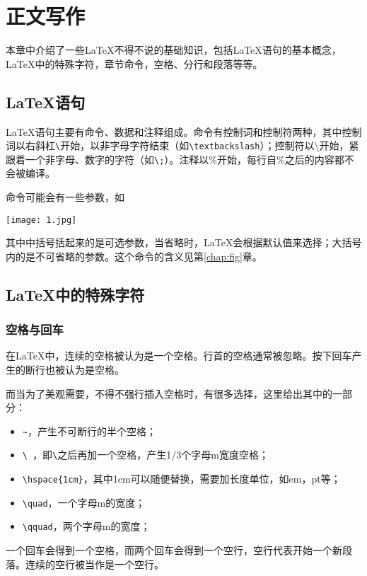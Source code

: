 \chapter{正文写作}
\label{c：main}
本章中介绍了一些\LaTeX 不得不说的基础知识，包括\LaTeX 语句的基本概念，\LaTeX 中的特殊字符，章节命令，空格、分行和段落等等。



\section{\LaTeX 语句}
\LaTeX 语句主要有命令、数据和注释组成。命令有控制词和控制符两种，其中控制词以右斜杠\verb|\|开始，以非字母字符结束（如\verb|\textbackslash|）；控制符以\textbackslash 开始，紧跟着一个非字母、数字的字符（如\verb|\;|）。注释以\%开始，每行自\%之后的内容都不会被编译。

命令可能会有一些参数，如
\begin{code}
        \texttt{[image: 1.jpg]}
\end{code}
其中中括号括起来的是可选参数，当省略时，\LaTeX{}会根据默认值来选择；大括号内的是不可省略的参数。这个命令的含义见第\ref{chap:fig}章。

\section{\LaTeX 中的特殊字符}
\subsection{空格与回车}
在\LaTeX 中，连续的空格被认为是一个空格。行首的空格通常被忽略。按下回车产生的断行也被认为是空格。\par
而当为了美观需要，不得不强行插入空格时，有很多选择，这里给出其中的一部分：
\begin{itemize}
\item{}\verb|~|，产生不可断行的半个空格；
\item{}\verb|\ |，即\verb|\|之后再加一个空格，产生1/3个字母m宽度空格；
\item{}\verb|\hspace{1cm}|，其中1cm可以随便替换，需要加长度单位，如em，pt等；
\item{}\verb|\quad|，一个字母m的宽度；
\item{}\verb|\qquad|，两个字母m的宽度；
\end{itemize}

一个回车会得到一个空格，而两个回车会得到一个空行，空行代表开始一个新段落。连续的空行被当作是一个空行。

